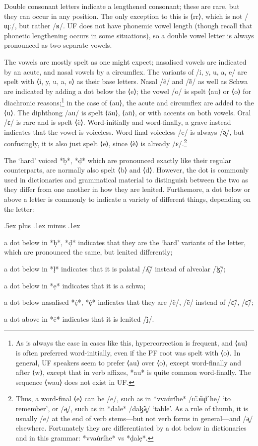 \documentclass[a4paper, 12pt, oneside, final]{article}
\begin{document}
Double consonant letters indicate a lengthened consonant; these are rare, but they can occur in any position. The only
exception to this is ⟨rr⟩, which is not /ɰː/, but rather /ʀ/. UF does not have phonemic vowel length (though recall
that phonetic lengthening occurs in some situations), so a double vowel letter is always pronounced as two separate vowels.

The vowels are mostly spelt as one might expect; nasalised vowels are indicated by an acute, and nasal vowels by a circumflex.
The variants of /i, y, u, a, e/ are spelt with ⟨i, y, u, a, e⟩ as their base letters. Nasal /ẽ/ and /ẽ̃/ as well as Schwa are
indicated by adding a dot below the ⟨e⟩; the vowel /o/ is spelt ⟨au⟩ or ⟨o⟩ for diachronic reasons;\footnote{As is always the
case in cases like this, hypercorrection is frequent, and ⟨au⟩ is often preferred word-initially, even if the
PF root was spelt with ⟨o⟩. In general, UF speakers seem to prefer ⟨au⟩ over ⟨o⟩, except word-finally and after ⟨w⟩, except
that in verb affixes, *au* is quite common word-finally. The sequence ⟨wau⟩ does not exist in UF.} in the case of
⟨au⟩, the acute and circumflex are added to the ⟨u⟩. The diphthong /au/ is spelt ⟨äu⟩, ⟨aü⟩, or with accents on both vowels. Oral
/ɛ/ is rare and is spelt ⟨è⟩. Word-initially and word-finally, a grave instead indicates that the vowel is voiceless. Word-final
voiceless /e/ is always /ə̥/, but confusingly, it is also just spelt ⟨e⟩, since ⟨è⟩ is already /ɛ/.\footnote{Thus, a word-final ⟨e⟩
can be /e/, such as in *vvaúríhe* /ʋ̃ːɔ̃ɰĩˈhe/ ‘to remember’, or /ə̥/, such as in *dale* /daɮ̃ə̥/ ‘table’. As a rule of thumb, it is
usually /e/ at the end of verb stems—but not verb forms in general—and /ə̥/ elsewhere. Fortunately they are differentiated by a
dot below in dictionaries and in this grammar: *vvaúríhe* vs *ḍalẹ*.}

The ‘hard’ voiced *ḅ*, *ḍ* which are pronounced exactly like their regular counterparts, are normally also spelt ⟨b⟩ and
⟨d⟩. However, the dot is commonly used in dictionaries and grammatical material to distinguish between the two
as they differ from one another in how they are lenited. Furthemore, a dot below or above a letter is commonly to indicate
a variety of different things, depending on the letter:
\begin{items}\itemsep .5ex plus .1ex minus .1ex\relax
\item a dot below in *ḅ*, *ḍ* indicates that they are the ‘hard’ variants of the letter, which are pronounced
      the same, but lenited differently;
\item a dot below in *ḷ* indicates that it is palatal /ʎ̝̃/ instead of alveolar /ɮ̃/;
\item a dot below in *ẹ* indicates that it is a schwa;
\item a dot below nasalised *ẹ́*, *ệ* indicates that they are /ẽ/, /ẽ̃/ instead of /ɛ̃/, /ɛ̃̃/;
\item a dot above in *ċ* indicates that it is lenited /j̊/.
\end{items}
\end{document}
